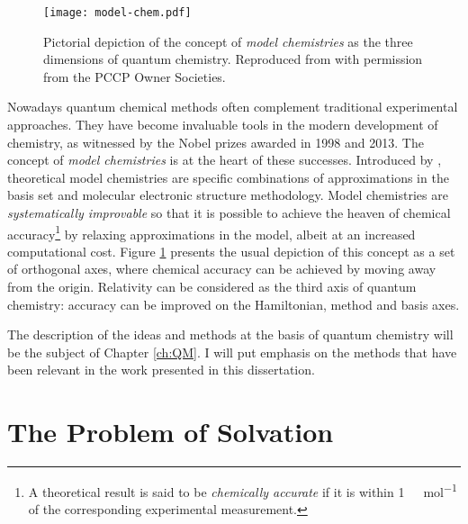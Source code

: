 \begin{figure}[tb]
\centering
\texttt{[image: model-chem.pdf]}
\caption[Pictorial depiction of the concept of \emph{model chemistries}.]{
Pictorial depiction of the concept of \emph{model chemistries} as the
three dimensions of quantum chemistry.\autocite{Pople1999-gt, Saue2011-qg}
Reproduced from  with permission from the PCCP Owner Societies.
}
\label{fig:RQC-axis}
\end{figure}

 Nowadays
quantum chemical methods often complement traditional experimental
approaches. They have become invaluable tools in the modern development
of chemistry,\autocite{Lee1995-pw, Helgaker2004-oz, Tajti2004-ye} as
witnessed by the Nobel prizes awarded in 1998\autocite{Nobel1998} and
2013.\autocite{Nobel2013}
The concept of \emph{model chemistries} is at the heart of these
successes. Introduced by \citeauthor{Pople1999-gt}, theoretical model
chemistries are specific combinations of approximations in the basis set
and molecular electronic structure methodology.\autocite{Pople1999-gt}
Model chemistries are \emph{systematically improvable} so that it is
possible to achieve the heaven of chemical
accuracy\footnote{A theoretical result is said to be \emph{chemically
accurate} if it is within \SI{1}{\kilo\calorie\per\mol} of the corresponding
experimental measurement.} by relaxing
approximations in the model, albeit at an increased computational cost.
Figure \ref{fig:RQC-axis} presents the usual depiction of this concept
as a set of orthogonal axes, where chemical accuracy can be achieved by
moving away from the origin.
Relativity can be considered as the third axis of quantum
chemistry: accuracy can be improved on the Hamiltonian, method
and basis axes.\autocite{Saue2011-qg}

The description of the ideas and methods at the basis of quantum
chemistry will be the subject of Chapter \ref{ch:QM}.
I will put emphasis on the methods that have been relevant in the work
presented in this dissertation.

\section*{The Problem of Solvation}


